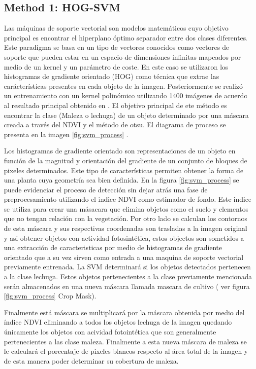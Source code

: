\documentclass[journal,article,submit,moreauthors,pdftex]{Definitions/mdpi}
\begin{document}
\subsection{Method 1: HOG-SVM}
Las máquinas de soporte vectorial son modelos matemáticos cuyo objetivo principal es encontrar el hiperplano óptimo separador entre dos clases diferentes. Este paradigma se basa en un tipo de vectores conocidos como vectores de soporte que pueden estar en un espacio de dimensiones infinitas mapeados por medio de un kernel y un parámetro de coste\cite{c55}. En este caso se utilizaron los histogramas de gradiente orientado (HOG) como técnica que extrae las carácterísticas presentes en cada objeto de la imagen. Posteriormente se realizó un entrenamiento con un kernel polinómico utilizando 1400 imágenes de acuerdo al resultado principal obtenido en \cite{c4}. El objetivo principal de ete método es encontrar la clase (Maleza o lechuga) de un objeto determinado por una máscara creada a través del NDVI y el método de otsu. El diagrama de proceso se presenta en la imagen \ref{fig:svm_process} \cite{c4}.

Los histogramas de gradiente orientado son representaciones de un objeto en función de la magnitud y orientación del gradiente de un conjunto de bloques de pixeles determinados\cite{c4}. Este tipo de características permiten obtener la forma de una planta cuya geometría sea bien definida. En la figura \ref{fig:svm_process} se puede evidenciar el proceso de detección sin dejar atrás una fase de preprocesamiento utilizando el indice NDVI como estimador de fondo. Este indice se utiliza para crear una másacara que elimina objetos como el suelo y elementos que no tengan relación con la vegetación. Por otro lado se calculan los contornos de esta máscara y sus respectivas coordenadas son trasladas a la imagen original y asi obtener objetos con actividad fotosintética, estos objectos son sometidos a una extracción de caracteristicas por medio de histogramas de gradiente orientado que a su vez sirven como entrada a una maquina de soporte vectorial previamente entrenada. La SVM determinará si los objetos detectados pertenecen a la clase lechuga. Estos objetos pertenecientes a la clase previamente mencionada serán almacenados en una nueva máscara llamada mascara de cultivo ( ver figura \ref{fig:svm_process} Crop Mask).

Finalmente está máscara se multiplicará por la máscara obtenida por medio del índice NDVI eliminando a todos los objetos lechuga de la imagen quedando únicamente los objetos con acividad fotointética que son generalmente pertenecientes a las clase maleza. Finalmente a esta nueva máscara de maleza se le calculará el porcentaje de pixeles blancos respecto al área total de la imagen y de esta manera poder determinar su cobertura de maleza.
\end{document}
